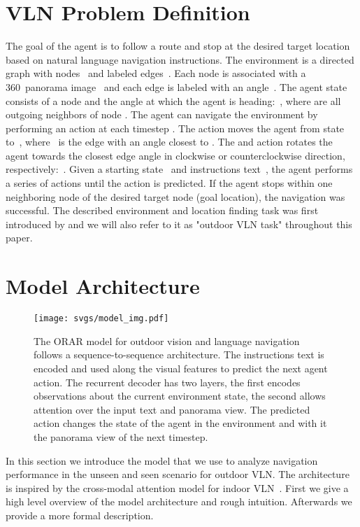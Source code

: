 \documentclass[11pt]{article}
\begin{document}
\section{VLN Problem Definition}
\label{sec:problem}
The goal of the agent is to follow a route and stop at the desired target location based on natural language navigation instructions. The environment is a directed graph with nodes~ and labeled edges~. Each node is associated with a 360\degree~panorama image~ and each edge is labeled with an angle~. The agent state~ consists of a node and the angle at which the agent is heading:~, where  are all outgoing neighbors of node . The agent can navigate the environment by performing an action  at each timestep . The  action moves the agent from state~ to~, where~ is the edge with an angle closest to . The  and  action rotates the agent towards the closest edge angle in clockwise or counterclockwise direction, respectively:~. Given a starting state~ and instructions text~, the agent performs a series of actions  until the  action is predicted. If the agent stops within one neighboring node of the desired target node (goal location), the navigation was successful. The described environment and location finding task was first introduced by \cite{Chen2018Touchdown} and we will also refer to it as "outdoor VLN task" throughout this paper. 

\section{Model Architecture}
\label{model}
\begin{figure}[t]
    \centering
    \texttt{[image: svgs/model\_img.pdf]}
    \caption{The ORAR model for outdoor vision and language navigation follows a sequence-to-sequence architecture. The instructions text is encoded and used along the visual features to predict the next agent action. The recurrent decoder has two layers, the first encodes observations about the current environment state, the second allows attention over the input text and panorama view. The predicted action changes the state of the agent in the environment and with it the panorama view of the next timestep.}
    \label{fig:model}
\end{figure}

In this section we introduce the model that we use to analyze navigation performance in the unseen and seen scenario for outdoor VLN. The architecture is inspired by the cross-modal attention model for indoor VLN~\citep{vln_ce}. First we give a high level overview of the model architecture and rough intuition. Afterwards we provide a more formal description.
\end{document}
